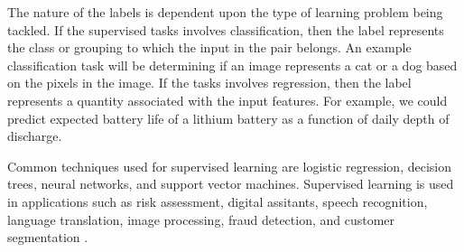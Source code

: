 \documentclass[12pt]{report}
\begin{document}
The nature of the labels is dependent upon the type of learning problem being tackled.
If the supervised tasks involves classification, then the label represents 
the class or grouping to which the input in the pair belongs. An example classification task will be determining if an image represents a cat or a dog based on the pixels in the image. If the tasks involves regression, then the label represents a quantity associated with the input features. For example, we 
could predict expected battery life of a lithium battery  as a function of daily depth of discharge.  




Common techniques used for supervised learning are logistic regression, decision trees, neural networks, and support vector machines.
Supervised learning is used in applications such as risk assessment, digital assitants, speech recognition, language translation, 
image processing, fraud detection, and  customer segmentation \cite{Nevala2017}.
\end{document}
